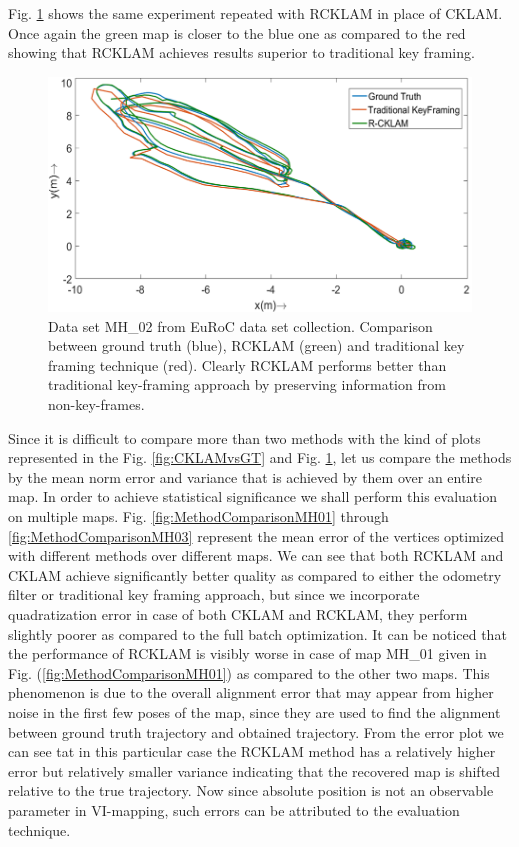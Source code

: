 Fig. \ref{fig:RCKLAMvsGT} shows the same experiment repeated with RCKLAM in place of CKLAM. Once again the green map is closer to the blue one as compared to the red showing that RCKLAM achieves results superior to traditional key framing. 

\begin{figure}
	\centering
		\includegraphics[width=1.00\textwidth]{images/RCKLAMvsGT.png}
  \caption{Data set MH\_02 from EuRoC \cite{Burri25012016} data set collection. Comparison between ground truth (blue), RCKLAM (green) and traditional key framing technique (red). Clearly RCKLAM performs better than traditional key-framing approach by preserving information from non-key-frames.}
  \label{fig:RCKLAMvsGT}
\end{figure}


Since it is difficult to compare more than two methods with the kind of plots represented in the Fig. \ref{fig:CKLAMvsGT} and Fig. \ref{fig:RCKLAMvsGT}, let us compare the methods by the mean norm error and variance that is achieved by them over an entire map. In order to achieve statistical significance we shall perform this evaluation on multiple maps. Fig. \ref{fig:MethodComparisonMH01} through \ref{fig:MethodComparisonMH03} represent the mean error of the vertices optimized with different methods over different maps. We can see that both RCKLAM and CKLAM achieve significantly better quality as compared to either the odometry filter or traditional key framing approach, but since we incorporate quadratization error in case of both CKLAM and RCKLAM, they perform slightly poorer as compared to the full batch optimization. It can be noticed that the performance of RCKLAM is visibly worse in case of map MH\_01 given in Fig. (\ref{fig:MethodComparisonMH01}) as compared to the other two maps. This phenomenon is due to the overall alignment error that may appear from higher noise in the first few poses of the map, since they are used to find the alignment between ground truth trajectory and obtained trajectory. From the error plot we can see tat in this particular case the RCKLAM method has a relatively higher error but relatively smaller variance indicating that the recovered map is shifted relative to the true trajectory. Now since absolute position is not an observable parameter in VI-mapping, such errors can be attributed to the evaluation technique.

